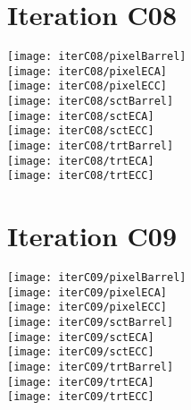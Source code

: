 \documentclass[10pt]{article}
\begin{document}
\section{Iteration C08}

\begin{centering}


\texttt{[image: iterC08/pixelBarrel]}\\
\texttt{[image: iterC08/pixelECA]}\\
\texttt{[image: iterC08/pixelECC]}\\

\texttt{[image: iterC08/sctBarrel]}\\
\texttt{[image: iterC08/sctECA]}\\
\texttt{[image: iterC08/sctECC]}\\

\texttt{[image: iterC08/trtBarrel]}\\
\texttt{[image: iterC08/trtECA]}\\
\texttt{[image: iterC08/trtECC]}\\

\end{centering}

\vspace{10pt}
\section{Iteration C09}

\begin{centering}


\texttt{[image: iterC09/pixelBarrel]}\\
\texttt{[image: iterC09/pixelECA]}\\
\texttt{[image: iterC09/pixelECC]}\\

\texttt{[image: iterC09/sctBarrel]}\\
\texttt{[image: iterC09/sctECA]}\\
\texttt{[image: iterC09/sctECC]}\\

\texttt{[image: iterC09/trtBarrel]}\\
\texttt{[image: iterC09/trtECA]}\\
\texttt{[image: iterC09/trtECC]}\\

\end{centering}
\end{document}
